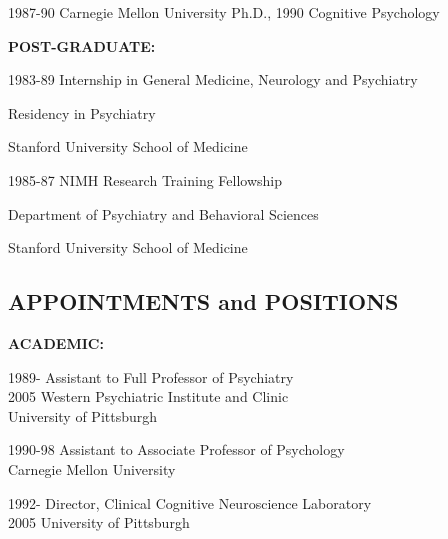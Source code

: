 \documentclass[10 pt]{article}
\begin{document}
1987-90 Carnegie Mellon University \hspace{0.99in} Ph.D., 1990 Cognitive Psychology
    \vspace{0.2in}

{\fontsize{12pt}{16 pt}\selectfont \textbf{POST-GRADUATE:}}
    \smallskip

1983-89 Internship in General Medicine, Neurology and Psychiatry

\hspace{0.46in} Residency in Psychiatry

\hspace{0.46in} Stanford University School of Medicine
    \smallskip

1985-87 NIMH Research Training Fellowship

\hspace{0.46in} Department of Psychiatry and Behavioral Sciences


\hspace{0.46in} Stanford University School of Medicine

    \newpage


    \begin{center}
\section*{APPOINTMENTS and POSITIONS} \label{secAaP}
    \end{center}
    \vspace{0.2in}

{\fontsize{13pt}{16 pt}\selectfont \textbf{ACADEMIC:}}
    \smallskip

1989- \hspace{0.4in} Assistant to Full Professor of Psychiatry
\\2005 \hspace{0.44in} Western Psychiatric Institute and Clinic
\\ \hspace*{.77in} University of Pittsburgh
    \smallskip

1990-98 \hspace{0.27in} Assistant to Associate Professor of Psychology
\\ \hspace*{.77in} Carnegie Mellon University
    \smallskip

1992- \hspace{0.41in} Director, Clinical Cognitive Neuroscience Laboratory
\\2005 \hspace{0.46in} University of Pittsburgh
    \smallskip
\end{document}
